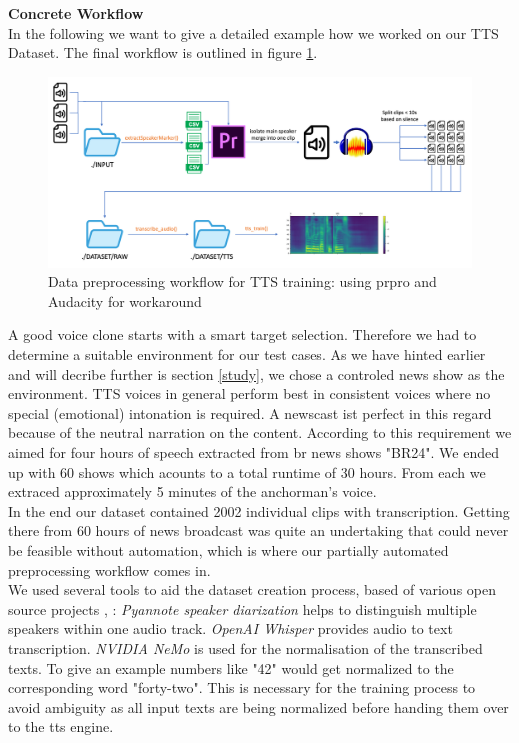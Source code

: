 \documentclass[
  a4paper,  %
  twoside,  %
  bibliography=totoc,
  headsepline,
  cleardoublepage=empty,
  parskip=half,
  draft=false
]{scrbook}
\begin{document}
\textbf{Concrete Workflow} \\
In the following we want to give a detailed example how we worked on our TTS Dataset. The final workflow is outlined in figure \ref{fig:dvt-tts-wf}.
\begin{figure}[h]
  \centering
  \includegraphics[width=1\textwidth]{./graphics/images/tts/tts prpro.png}
  \caption{Data preprocessing workflow for TTS training: using \gls{prpro} and Audacity for workaround}
  \label{fig:dvt-tts-wf}
\end{figure}
A good voice clone starts with a smart target selection. Therefore we had to determine a suitable environment for our test cases. As we have hinted earlier and will decribe further is section \ref{study}, we chose a controled news show as the environment. TTS voices in general perform best in consistent voices where no special (emotional) intonation is required. A newscast ist perfect in this regard because of the neutral narration on the content. 
According to this requirement we aimed for four hours of speech extracted from \gls{br} news shows "BR24". We ended up with 60 shows which acounts to a total runtime of 30 hours. From each we extraced approximately 5 minutes of the anchorman's voice.\\
In the end our dataset contained 2002 individual clips with transcription. Getting there from 60 hours of news broadcast was quite an undertaking that could never be feasible without automation, which is where our partially automated preprocessing workflow comes in. \\
We used several tools to aid the dataset creation process, based of various open source projects \cite{micaAudioSplitterUsing2023}, \cite{harperEndtoEndToolkitVoice2023}: \textit{Pyannote speaker diarization} helps to distinguish multiple speakers within one audio track. \textit{OpenAI Whisper} provides audio to text transcription. \textit{NVIDIA NeMo} is used for the normalisation of the transcribed texts. To give an example numbers like "42" would get normalized to the corresponding word "forty-two". This is necessary for the training process to avoid ambiguity as all input texts are being normalized before handing them over to the \gls{tts} engine. \\
\end{document}
